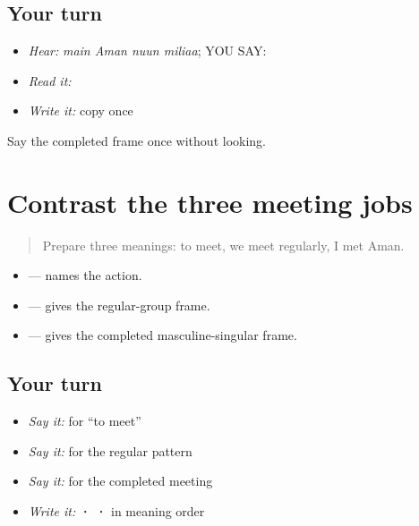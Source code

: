 \subsection*{Your turn}
\begin{itemize}
\raggedright
  \item \emph{Hear:} \emph{main Aman nuun miliaa}; YOU SAY: \textbf{   }
  \item \emph{Read it:} \textbf{   }
  \item \emph{Write it:} copy \textbf{} once
\end{itemize}

\begin{tcolorbox}[breakable,colback=teal!4,colframe=teal!35!black,title={Before you move on}]
Say the completed frame once without looking.
\end{tcolorbox}
\section[\texorpdfstring{\pa{ਮਿਲਣਾ} · \pa{ਅਸੀਂ} \pa{ਮਿਲਦੇ} … (milnaa; asiin …)}{ਮਿਲਣਾ · ਅਸੀਂ ਮਿਲਦੇ … (milnaa; asiin …)}]{Contrast the three meeting jobs}

\label{lesson:PA-C188-family-contrast}



\begin{quote}
Prepare three meanings: to meet, we meet regularly, I met Aman.
\end{quote}

\begin{grammarlens}[title={Grammar Lens: one family, three bounded jobs}]
\begin{itemize}
\raggedright
  \item \textbf{} — names the action.
  \item \textbf{  } — gives the regular-group frame.
  \item \textbf{   } — gives the completed masculine-singular frame.
\end{itemize}
\end{grammarlens}

\subsection*{Your turn}
\begin{itemize}
\raggedright
  \item \emph{Say it:} \textbf{} for “to meet”
  \item \emph{Say it:} \textbf{  } for the regular pattern
  \item \emph{Say it:} \textbf{   } for the completed meeting
  \item \emph{Write it:} \textbf{ ·  · } in meaning order
\end{itemize}

